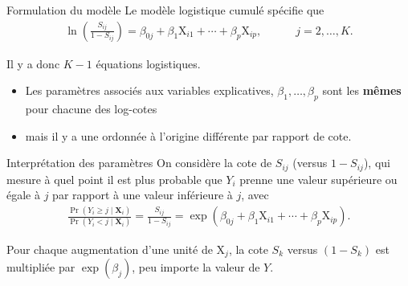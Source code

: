 \documentclass[
  ignorenonframetext,
]{beamer}
\providecommand{\tightlist}{%
  \setlength{\itemsep}{0pt}\setlength{\parskip}{0pt}}\usepackage{longtable,booktabs,array}
\begin{document}
\begin{frame}{Formulation du modèle}
\protect\hypertarget{formulation-du-moduxe8le}{}
Le modèle logistique cumulé spécifie que \begin{align*}
\ln \left(\frac{S_{ij}}{1-S_{ij}}\right) = \beta_{0j} + \beta_1 \mathrm{X}_{i1} + \cdots + \beta_p \mathrm{X}_{ip}, \quad \qquad  j=2, \ldots, K.
\end{align*}

Il y a donc \(K-1\) équations logistiques.

\begin{itemize}
\tightlist
\item
  Les paramètres associés aux variables explicatives,
  \(\beta_1, \ldots, \beta_p\) sont les \textbf{mêmes} pour chacune des
  log-cotes
\item
  mais il y a une ordonnée à l'origine différente par rapport de cote.
\end{itemize}
\end{frame}

\begin{frame}{Interprétation des paramètres}
\protect\hypertarget{interpruxe9tation-des-paramuxe8tres}{}
On considère la cote de \(S_{ij}\) (versus \(1-S_{ij}\)), qui mesure à
quel point il est plus probable que \(Y_i\) prenne une valeur supérieure
ou égale à \(j\) par rapport à une valeur inférieure à \(j\), avec
\begin{align*}
\frac{\Pr(Y_i \geq j \mid \mathbf{X}_i)}{\Pr(Y_i < j \mid \mathbf{X}_i)} = \frac{S_{ij}}{1-S_{ij}} = \exp( \beta_{0j} + \beta_1\mathrm{X}_{i1} + \cdots + \beta_p \mathrm{X}_{ip}).
\end{align*}

Pour chaque augmentation d'une unité de \(\mathrm{X}_j\), la cote
\(S_k\) versus \((1-S_k)\) est multipliée par \(\exp(\beta_j)\), peu
importe la valeur de \(Y\).
\end{frame}
\end{document}
